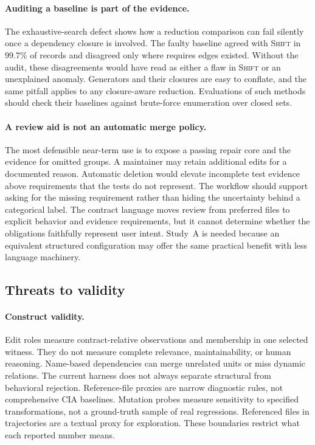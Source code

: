 \documentclass[a4paper,fleqn]{cas-sc}
\newcommand{\tool}{\textsc{Shift}}
\begin{document}
\paragraph{Auditing a baseline is part of the evidence.}
The exhaustive-search defect shows how a reduction comparison can fail silently once a dependency closure is involved. The faulty baseline agreed with \tool{} in 99.7\% of records and disagreed only where requires edges existed. Without the audit, these disagreements would have read as either a flaw in \tool{} or an unexplained anomaly. Generators and their closures are easy to conflate, and the same pitfall applies to any closure-aware reduction. Evaluations of such methods should check their baselines against brute-force enumeration over closed sets.

\paragraph{A review aid is not an automatic merge policy.}
The most defensible near-term use is to expose a passing repair core and the evidence for omitted groups. A maintainer may retain additional edits for a documented reason. Automatic deletion would elevate incomplete test evidence above requirements that the tests do not represent. The workflow should support asking for the missing requirement rather than hiding the uncertainty behind a categorical label. The contract language moves review from preferred files to explicit behavior and evidence requirements, but it cannot determine whether the obligations faithfully represent user intent. Study~A is needed because an equivalent structured configuration may offer the same practical benefit with less language machinery.

\subsection{Threats to validity}\label{sec:validity}

\paragraph{Construct validity.}
Edit roles measure contract-relative observations and membership in one selected witness. They do not measure complete relevance, maintainability, or human reasoning. Name-based dependencies can merge unrelated units or miss dynamic relations. The current harness does not always separate structural from behavioral rejection. Reference-file proxies are narrow diagnostic rules, not comprehensive CIA baselines. Mutation probes measure sensitivity to specified transformations, not a ground-truth sample of real regressions. Referenced files in trajectories are a textual proxy for exploration. These boundaries restrict what each reported number means.
\end{document}
